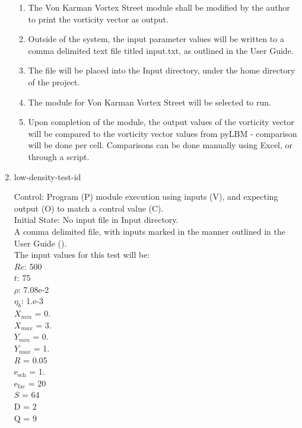 \documentclass[12pt, titlepage]{article}
\newcounter{testcounter} %
\begin{document}
\begin{enumerate}
\begin{enumerate}
\item The Von Karman Vortex Street module shall be modified by the author to
  print the vorticity vector as output.
\item Outside of the system, the input parameter values will be written to a
  comma delimited text file titled input.txt, as outlined in the User Guide.
\item The file will be placed into the Input directory, under the home directory of the project.
\item The module for Von Karman Vortex Street will be selected to run.
\item Upon completion of the module, the output values of the vorticity vector
  will be compared to the vorticity vector values from pyLBM - comparison will
  be done per cell. Comparisons can be done manually using Excel, or through a
  script.
\end{enumerate}

\item{low-density-test-id\thetestcounter \\}

Control: Program (P) module execution using inputs (V), and expecting output (O)
to match a control value (C).\\
					
Initial State: No input file in Input directory.\\
					
A comma delimited file, with inputs marked in the manner outlined in the User
Guide (\citet{LBM_UserGuide_PM}).\\The input values for this test will be:\\
$Re$: 500\\
$t$: 75\\
$\rho$: 7.08e-2\\
$\eta_b$: 1.e-3\\
$X_{min}$ = 0.\\
$X_{max}$ = 3.\\
$Y_{min}$ = 0.\\
$Y_{max}$ = 1.\\
$R$ = 0.05\\
$\mathrm{e_{sch}}$ = 1.\\
$\mathrm{e_{fac}}$ = 20\\
$S$ = 64\\
$\mathrm{D}$ = 2\\
$\mathrm{Q}$ = 9\\


\end{enumerate}
\end{document}
